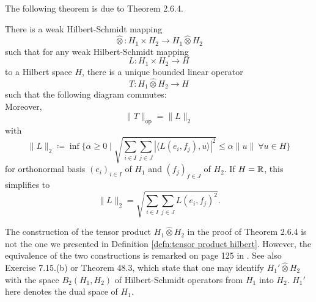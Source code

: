 The following theorem is due to \cite{kadisonringrose1997fundamentalsofoperatoralgebras} Theorem 2.6.4.
\begin{thm} \label{thm:universal_property_tensor_product}
    There is a weak Hilbert-Schmidt mapping
    \[ \hat{\otimes}: H_1 \times H_2 \to H_1 \hat{\otimes} H_2 \]
    such that for any weak Hilbert-Schmidt mapping
    \[ L: H_1 \times H_2 \to H \]
    to a Hilbert space $H$, there is a unique bounded linear operator
    \[ T: H_1 \hat{\otimes} H_2 \to H \]
    such that the following diagram commutes: \\
    Moreover,
    \begin{equation} \label{equality of norms in universal property}
        \| T \|_{\mathrm{op}} = \| L \|_2
    \end{equation}
    with
    \[ \| L \|_2 \coloneqq \inf \{ \alpha \geq 0 \mid \sqrt{\sum\limits_{i \in I} \sum\limits_{j \in J} |\langle L(e_i, f_j), u \rangle |^2} \leq \alpha \| u \| \ \forall u \in H \} \]
    for orthonormal basis $(e_i)_{i \in I}$ of $H_1$ and $(f_j)_{f \in J}$ of $H_2$.
    If $H = \mathbb{R}$, this simplifies to
    \[ \| L \|_2 = \sqrt{\sum\limits_{i \in I} \sum\limits_{j \in J} L(e_i, f_j)^2}. \]
\end{thm}

\begin{remark}
    The construction of the tensor product $H_1 \hat{\otimes} H_2$ in the proof of \cite{kadisonringrose1997fundamentalsofoperatoralgebras} Theorem 2.6.4 is not the one we presented in Definition \ref{defn:tensor product hilbert}. However, the equivalence of the two constructions is remarked on page 125 in \cite{kadisonringrose1997fundamentalsofoperatoralgebras}.
    See also \cite{weidmann1980linear} Exercise 7.15.(b) or \cite{treves2006topological} Theorem 48.3, which state that one may identify $H_1' \hat{\otimes} H_2$ with the space $B_2(H_1, H_2)$ of Hilbert-Schmidt operators from $H_1$ into $H_2$. $H_1'$ here denotes the dual space of $H_1$.
\end{remark}

